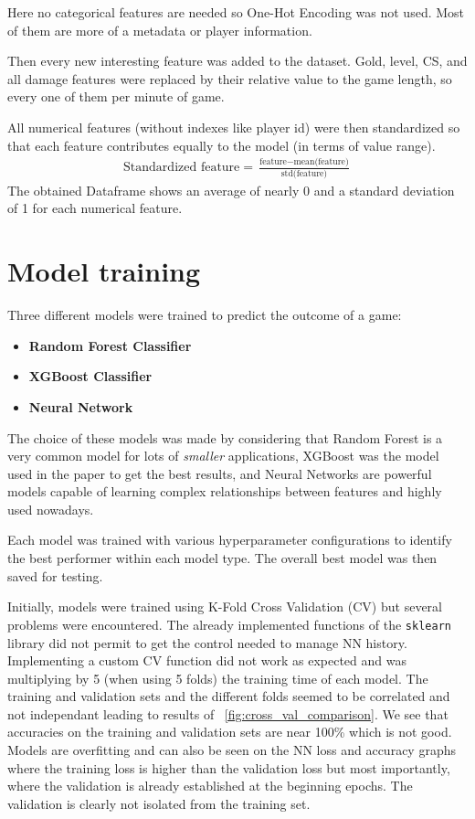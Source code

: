 \documentclass[12pt, a4paper]{article}
\begin{document}
Here no categorical features are needed so One-Hot Encoding was not used.
Most of them are more of a metadata or player information.

Then every new interesting feature was added to the dataset.
Gold, level, CS, and all damage features were replaced by their relative value to the game length, so every one of them per minute of game.

All numerical features (without indexes like player id) were then standardized so that each feature contributes equally to the model (in terms of value range).
\begin{align*}
    \text{Standardized feature} = \frac{\text{feature} - \text{mean(feature)}}{\text{std(feature)}}
\end{align*}
The obtained Dataframe shows an average of nearly 0 and a standard deviation of 1 for each numerical feature.

\section{Model training}
Three different models were trained to predict the outcome of a game:
\begin{itemize}
    \item \textbf{Random Forest Classifier}
    \item \textbf{XGBoost Classifier}
    \item \textbf{Neural Network}
\end{itemize}
The choice of these models was made by considering that Random Forest is a very common model for lots of \emph{smaller} applications, XGBoost was the model used in the paper to get the best results, and Neural Networks are powerful models capable of learning complex relationships between features and highly used nowadays.

Each model was trained with various hyperparameter configurations to identify the best performer within each model type.
The overall best model was then saved for testing.

Initially, models were trained using K-Fold Cross Validation (CV) but several problems were encountered.
The already implemented functions of the \texttt{sklearn} library did not permit to get the control needed to manage NN history.
Implementing a custom CV function did not work as expected and was multiplying by 5 (when using 5 folds) the training time of each model.
The training and validation sets and the different folds seemed to be correlated and not independant leading to results of \figurename~\ref{fig:cross_val_comparison}.
We see that accuracies on the training and validation sets are near 100\% which is not good.
Models are overfitting and can also be seen on the NN loss and accuracy graphs where the training loss is higher than the validation loss but most importantly, where the validation is already established at the beginning epochs.
The validation is clearly not isolated from the training set.
\end{document}
